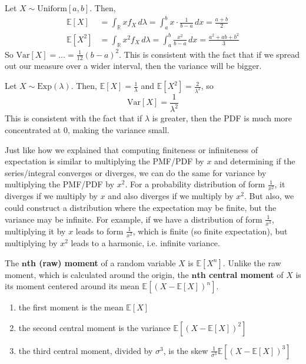 \documentclass{article}
\begin{document}
    \begin{example}[Uniform]
      Let $X \sim \mathrm{Uniform}[a, b]$. Then, 
      \begin{align*}
        \mathbb{E}[X] & = \int_\mathbb{R} x f_X \, d\lambda = \int_a^b x \cdot \frac{1}{b - a}\,dx = \frac{a + b}{2} \\
        \mathbb{E}[X^2] & = \int_\mathbb{R} x^2 f_X \,d\lambda = \int_a^b \frac{x^2}{b - a} \,dx = \frac{a^2 + ab + b^2}{3} 
      \end{align*}
      So $\mathrm{Var}[X] = \ldots = \frac{1}{12} (b - a)^2$. This is consistent with the fact that if we spread out our measure over a wider interval, then the variance will be bigger. 
    \end{example}

    \begin{example}[Exponential]
      Let $X \sim \mathrm{Exp}(\lambda)$. Then, $\mathbb{E}[X] = \frac{1}{\lambda}$ and $\mathbb{E}[X^2] = \frac{2}{\lambda^2}$, so 
      \begin{equation}
        \mathrm{Var}[X] = \frac{1}{\lambda^2}
      \end{equation}
      This is consistent with the fact that if $\lambda$ is greater, then the PDF is much more concentrated at $0$, making the variance small. 
    \end{example}

    Just like how we explained that computing finiteness or infiniteness of expectation is similar to multiplying the PMF/PDF by $x$ and determining if the series/integral converges or diverges, we can do the same for variance by multiplying the PMF/PDF by $x^2$. For a probability distribution of form $\frac{1}{x^2}$, it diverges if we multiply by $x$ and also diverges if we multiply by $x^2$. But also, we could construct a distribution where the expectation may be finite, but the variance may be infinite. For example, if we have a distribution of form $\frac{1}{x^3}$, multiplying it by $x$ leads to form $\frac{1}{x^2}$, which is finite (so finite expectation), but multiplying by $x^2$ leads to a harmonic, i.e. infinite variance. 

    \begin{definition}[Moment]
      The \textbf{$\mathbf{n}$th (raw) moment} of a random variable $X$ is $\mathbb{E}[X^n]$. Unlike the raw moment, which is calculated around the origin, the \textbf{$\mathbf{n}$th central moment} of $X$ is its moment centered around its mean $\mathbb{E}[(X - \mathbb{E}[X])^n]$. 
      \begin{enumerate}
        \item the first moment is the mean $\mathbb{E}[X]$
        \item the second central moment is the variance $\mathbb{E}[(X - \mathbb{E}[X])^2]$ 
        \item the third central moment, divided by $\sigma^3$, is the skew $\frac{1}{\sigma^3} \mathbb{E}[(X - \mathbb{E}[X])^3]$ 
      \end{enumerate}
    \end{definition}
\end{document}
